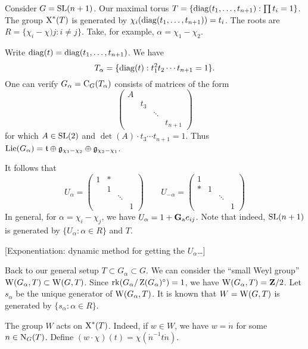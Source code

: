 \begin{example}
Consider $G=\operatorname{SL}(n+1)$. Our maximal torus 
$T=\{\operatorname{diag}(t_1,\dots,t_{n+1}):\prod t_i=1\}$. The group 
$\operatorname{X}^\ast(T)$ is generated by 
$\chi_i(\operatorname{diag}(t_1,\dots,t_{n+1}))=t_i$. The roots are 
$R=\{\chi_i-\chi)j:i\ne j\}$. Take, for example, $\alpha=\chi_1-\chi_2$. 

Write $\operatorname{diag}(t)=\operatorname{diag}(t_1,\dots,t_{n+1})$. We have 
\[
  T_\alpha=\{\operatorname{diag}(t):t_1^2 t_2 \dotsm t_{n+1}=1\} .
\]
One can verify $G_\alpha=\operatorname{C}_G(T_\alpha)$ consists of matrices of the 
form 
\[
  \begin{pmatrix} A \\ & t_3 \\ & & \ddots \\ & & & t_{n+1} \end{pmatrix}
\]
for which $A\in \operatorname{SL}(2)$ and $\det(A)\cdot t_3\dotsm t_{n+1}=1$. Thus 
$\operatorname{Lie}(G_\alpha)=\mathfrak{t}\oplus \mathfrak{g}_{\chi_1-\chi_2}\oplus \mathfrak{g}_{\chi_2-\chi_1}$. 

It follows that 
\[
  U_\alpha = \begin{pmatrix} 1 & \ast \\ & 1  \\ & & \ddots \\ & & & 1 \end{pmatrix} \qquad U_{-\alpha} = \begin{pmatrix} 1 \\ \ast & 1  \\ & & \ddots \\ & & & 1 \end{pmatrix}
\]
In general, for $\alpha=\chi_i-\chi_j$, we have 
$U_\alpha = 1+\mathbf{G}_\mathrm{a} e_{i j}$. Note that indeed, $\operatorname{SL}(n+1)$ is generated by 
$\{U_\alpha:\alpha\in R\}$ and $T$. 
\end{example}

[Exponentiation: dynamic method for getting the $U_\alpha$\ldots]

Back to our general setup $T\subset G_\alpha\subset G$. We can consider the 
``small Weyl group'' $\operatorname{W}(G_\alpha,T)\subset \operatorname{W}(G,T)$. Since 
$\operatorname{rk}(G_\alpha/\operatorname{Z}(G_\alpha)^\circ)=1$, we have 
$\operatorname{W}(G_\alpha,T)=\mathbf{Z}/2$. Let $s_\alpha$ be the unique generator of 
$\operatorname{W}(G_\alpha,T)$. It is known that $W=\operatorname{W}(G,T)$ is generated by 
$\{s_\alpha:\alpha\in R\}$. 

The group $W$ acts on $\operatorname{X}^\ast(T)$. Indeed, if $w\in W$, we have 
$w=\dot n$ for some $n\in \operatorname{N}_G(T)$. Define 
$(w\cdot\chi)(t)=\chi(\dot n^{-1} t \dot n)$. 

